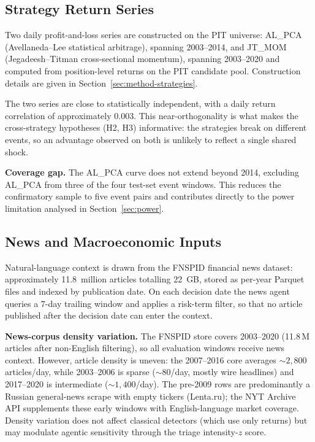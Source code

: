 \documentclass[11pt,a4paper]{article}
\begin{document}
\subsection{Strategy Return Series}\label{sec:data-pnl}

Two daily profit-and-loss series are constructed on the PIT universe: AL\_PCA
(Avellaneda--Lee statistical arbitrage), spanning 2003--2014, and JT\_MOM
(Jegadeesh--Titman cross-sectional momentum), spanning 2003--2020 and computed
from position-level returns on the PIT candidate pool. Construction details are
given in Section~\ref{sec:method-strategies}.

The two series are close to statistically independent, with a daily return
correlation of approximately $0.003$. This near-orthogonality is what makes the
cross-strategy hypotheses (H2, H3) informative: the strategies break on
different events, so an advantage observed on both is unlikely to reflect a
single shared shock.

\textbf{Coverage gap.} The AL\_PCA curve does not extend beyond 2014, excluding
AL\_PCA from three of the four test-set event windows. This reduces the
confirmatory sample to five event pairs and contributes directly to the power
limitation analysed in Section~\ref{sec:power}.

\subsection{News and Macroeconomic Inputs}\label{sec:data-context}

Natural-language context is drawn from the FNSPID financial news dataset:
approximately 11.8~million articles totalling 22~GB, stored as per-year Parquet
files and indexed by publication date. On each decision date the news agent
queries a 7-day trailing window and applies a risk-term filter, so that no
article published after the decision date can enter the context.

\textbf{News-corpus density variation.} The FNSPID store covers 2003--2020 (11.8\,M articles after non-English filtering), so all evaluation windows
  receive news context. However, article density is uneven: the 2007--2016 core averages ${\sim}2{,}800$ articles/day, while 2003--2006 is sparse
  (${\sim}80$/day, mostly wire headlines) and 2017--2020 is intermediate
  (${\sim}1{,}400$/day). The pre-2009 rows are predominantly a Russian
  general-news scrape with empty tickers (Lenta.ru); the NYT Archive API
  supplements these early windows with English-language market coverage.
  Density variation does not affect classical detectors (which use only returns)
  but may modulate agentic sensitivity through the triage intensity-$z$ score.
\end{document}
